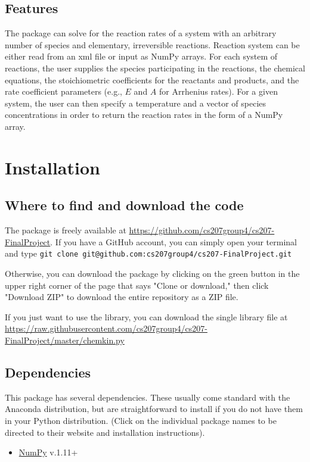 \documentclass[12pt]{article}
\begin{document}
\subsection{Features}
The package can solve for the reaction rates of a system with an arbitrary number of species and elementary, irreversible reactions. Reaction system can be either read from an xml file or input as NumPy arrays. For each system of reactions, the user supplies the species participating in the reactions, the chemical equations, the stoichiometric coefficients for the reactants and products, and the rate coefficient parameters (e.g., $E$ and $A$ for Arrhenius rates). For a given system, the user can then specify a temperature and a vector of species concentrations in order to return the reaction rates in the form of a NumPy array. 

\section{Installation} 

\subsection{Where to find and download the code}
The package is freely available at \url{https://github.com/cs207group4/cs207-FinalProject}. If you have a GitHub account, you can simply open your terminal and type
\newline
{\tt git clone git@github.com:cs207group4/cs207-FinalProject.git} \newline

Otherwise, you can download the package by clicking on the green button in the upper right corner of the page that says "Clone or download," then click "Download ZIP" to download the entire repository as a ZIP file. \newline

If you just want to use the library, you can download the single library file at \url{https://raw.githubusercontent.com/cs207group4/cs207-FinalProject/master/chemkin.py}

\subsection{Dependencies}

This package has several dependencies. These usually come standard with the Anaconda distribution, but are straightforward to install if you do not have them in your Python distribution. (Click on the individual package names to be directed to their website and installation instructions).  
\begin{itemize}
\item \href{http://www.numpy.org/}{NumPy} v.1.11+
\end{itemize}
\end{document}
